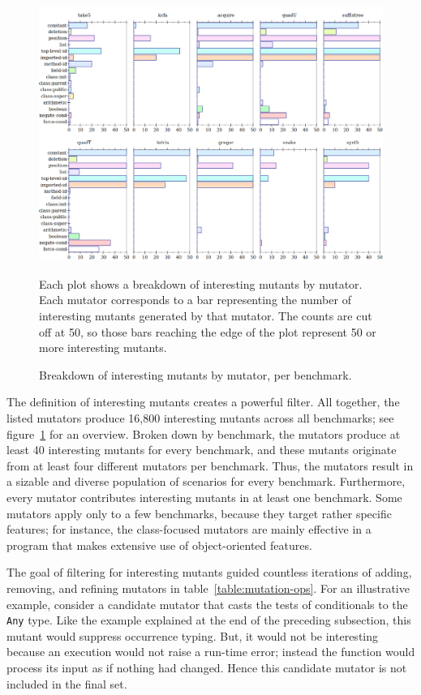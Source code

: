 \begin{figure}
 \centering
 \includegraphics[scale=0.33]{./plots/mutant-breakdown}

 \vspace{1em}

 \begin{minipage}{\textwidth}
 Each plot shows a breakdown of interesting mutants by mutator.
 Each mutator corresponds to a bar representing the number of interesting mutants generated by that mutator.
 The counts are cut off at 50, so those bars reaching the edge of the plot represent 50 or more interesting mutants.
 \end{minipage}

\caption{Breakdown of interesting mutants by mutator, per benchmark.}
 \label{fig:mutant-breakdown}
\end{figure}

The definition of interesting mutants creates a powerful filter. All
together, the listed mutators produce 16,800 interesting mutants across all benchmarks; see
figure~\ref{fig:mutant-breakdown} for an overview. Broken down by benchmark, the
mutators produce at least 40 interesting mutants for every benchmark, and
these mutants originate from at least four different mutators per benchmark.
Thus, the mutators result in a sizable and diverse population of scenarios for
every benchmark.  Furthermore, every mutator contributes interesting mutants in at least
one benchmark.  Some mutators apply only to a few benchmarks, because they
target rather specific features; for instance, the class-focused mutators are
mainly effective in a program that makes extensive use of object-oriented
features.

The goal of filtering for interesting mutants guided countless iterations of
adding, removing, and refining mutators in table~\ref{table:mutation-ops}.  For
an illustrative example, consider a candidate mutator that casts the tests of
conditionals to the {\tt Any} type. Like the example explained at the end of the
preceding subsection, this mutant would suppress occurrence typing. But, it
would not be interesting because an execution would not raise a run-time error;
instead the function would process its input as if nothing had changed. Hence
this candidate mutator is not included in the final set.

